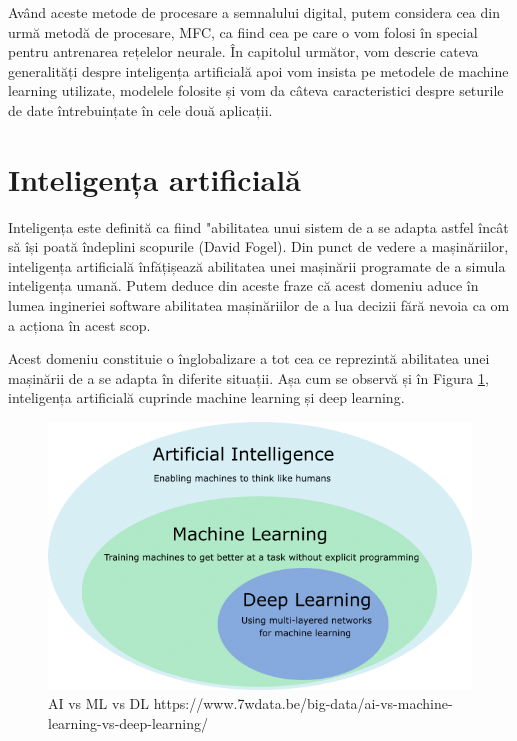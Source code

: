 \documentclass[a4paper,12pt]{report}
\begin{document}
	\bigbreak
	
	Având aceste metode de procesare a semnalului digital, putem considera cea din urmă metodă de procesare, MFC, ca fiind cea pe care o vom folosi în special pentru antrenarea rețelelor neurale. În capitolul următor, vom descrie cateva generalități despre  inteligența artificială apoi vom insista pe metodele de machine learning utilizate, modelele folosite și vom da câteva caracteristici despre seturile de date întrebuințate în cele două aplicații.
	
    \clearpage
    \section{Inteligența artificială}
     Inteligența este definită ca fiind "abilitatea unui sistem de a se adapta astfel încât să își poată îndeplini scopurile (David Fogel). Din punct de vedere a mașinăriilor, inteligența artificială înfățișează abilitatea unei mașinării programate de a simula inteligența umană. Putem deduce din aceste fraze că acest domeniu aduce în lumea ingineriei software abilitatea mașinăriilor de a lua decizii fără nevoia ca om a acționa în acest scop.
     
     Acest domeniu constituie o înglobalizare a tot cea ce reprezintă abilitatea unei mașinării de a se adapta în diferite situații. Așa cum se observă și în Figura \ref{fig:ai_ml_dl}, inteligența artificială cuprinde machine learning și deep learning.
     
     \begin{figure}[H]
     	\begin{center}
     		\includegraphics[scale=0.5]{images/AI_ML_DL.PNG}
     	\end{center}
     	\caption{AI vs ML vs DL \newline
     		\hspace{\linewidth}https://www.7wdata.be/big-data/ai-vs-machine-learning-vs-deep-learning/}
     	\label{fig:ai_ml_dl}
     \end{figure}
 
\end{document}
